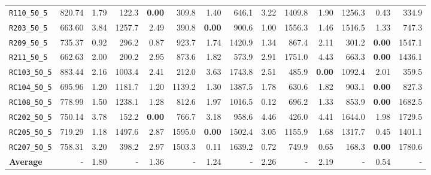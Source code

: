 \begin{table}[h]
\begin{adjustbox}{width=\textwidth}
\begin{tabular}{l r r r @{\hspace{8pt}} r r @{\hspace{8pt}} r r @{\hspace{8pt}} r r @{\hspace{8pt}} r r @{\hspace{8pt}} r r @{\hspace{8pt}}}
\texttt{R110\_50\_5} & 820.74 & 1.79 & 122.3 & \textbf{0.00} & 309.8 & 1.40 & 646.1 & 3.22 & 1409.8 & 1.90 & 1256.3 & 0.43 & 334.9 \\
\texttt{R203\_50\_5} & 663.60 & 3.84 & 1257.7 & 2.49 & 390.8 & \textbf{0.00} & 900.6 & 1.00 & 1556.3 & 1.46 & 1516.5 & 1.33 & 747.3 \\
\texttt{R209\_50\_5} & 735.37 & 0.92 & 296.2 & 0.87 & 923.7 & 1.74 & 1420.9 & 1.34 & 867.4 & 2.11 & 301.2 & \textbf{0.00} & 1547.1 \\
\texttt{R211\_50\_5} & 662.63 & 2.00 & 200.2 & 2.95 & 873.6 & 1.82 & 573.9 & 2.91 & 1751.0 & 4.43 & 663.3 & \textbf{0.00} & 1436.1 \\
\texttt{RC103\_50\_5} & 883.44 & 2.16 & 1003.4 & 2.41 & 212.0 & 3.63 & 1743.8 & 2.51 & 485.9 & \textbf{0.00} & 1092.4 & 2.01 & 359.5 \\
\texttt{RC104\_50\_5} & 695.96 & 1.20 & 1181.7 & 1.20 & 1139.2 & 1.30 & 1387.5 & 1.78 & 630.6 & 1.82 & 903.1 & \textbf{0.00} & 827.3 \\
\texttt{RC108\_50\_5} & 778.99 & 1.50 & 1238.1 & 1.28 & 812.6 & 1.97 & 1016.5 & 0.12 & 696.2 & 1.33 & 853.9 & \textbf{0.00} & 1682.5 \\
\texttt{RC202\_50\_5} & 750.14 & 3.78 & 152.2 & \textbf{0.00} & 766.7 & 3.18 & 958.6 & 4.46 & 426.0 & 4.41 & 1644.0 & 1.98 & 1729.5 \\
\texttt{RC205\_50\_5} & 719.29 & 1.18 & 1497.6 & 2.87 & 1595.0 & \textbf{0.00} & 1502.4 & 3.05 & 1155.9 & 1.68 & 1317.7 & 0.45 & 1401.1 \\
\texttt{RC207\_50\_5} & 758.31 & 3.20 & 398.2 & 2.97 & 1503.3 & 0.11 & 1639.2 & 0.72 & 749.9 & 0.65 & 168.3 & \textbf{0.00} & 1780.6 \\
\midrule
\textbf{Average} & - & 1.80 & - & 1.36 & - & 1.24 & - & 2.26 & - & 2.19 & - & 0.54 & - \\
\bottomrule
\end{tabular}
\end{adjustbox}
\end{table}